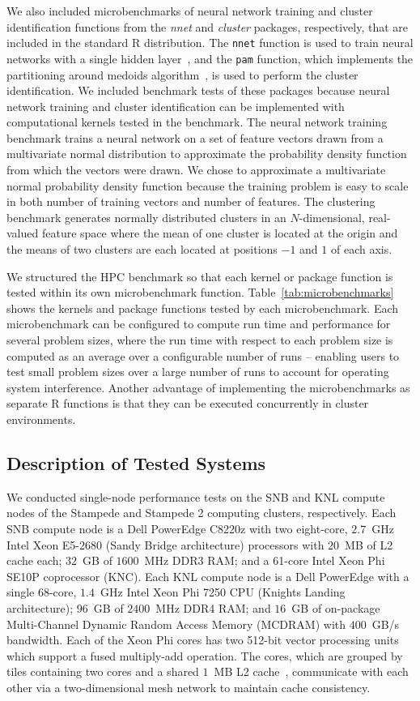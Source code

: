 We also included microbenchmarks of neural network training and cluster identification
functions from the \textit{nnet} and \textit{cluster} packages, respectively, that are
included in the standard R distribution. The \texttt{nnet} function is used to train
neural networks with a single hidden layer~\cite{ripley:pattern96}, and the \texttt{pam}
function, which implements the partitioning around medoids algorithm~\cite{chu:kmedoids,
reynolds:clustering}, is used to perform the cluster identification. We included benchmark
tests of these packages because neural network training and cluster identification can be
implemented with computational kernels tested in the benchmark. The neural network
training benchmark trains a neural network on a set of feature vectors drawn from a
multivariate normal distribution to approximate the probability density function from
which the vectors were drawn. We chose to approximate a multivariate normal probability
density function because the training problem is easy to scale in both number of training
vectors and number of features. The clustering benchmark generates normally distributed
clusters in an $N$-dimensional, real-valued feature space where the mean of one cluster is
located at the origin and the means of two clusters are each located at positions $-1$ and
$1$ of each axis.

We structured the HPC benchmark so that each kernel or package function is tested within
its own microbenchmark function. Table~\ref{tab:microbenchmarks} shows the kernels and
package functions tested by each microbenchmark. Each microbenchmark can be configured to
compute run time and performance for several problem sizes, where the run time with
respect to each problem size is computed as an average over a configurable number of runs
-- enabling users to test small problem sizes over a large number of runs to account for
operating system interference. Another advantage of implementing the microbenchmarks as
separate R functions is that they can be executed concurrently in cluster environments.

\subsection{Description of Tested Systems}

We conducted single-node performance tests on the SNB and KNL compute nodes of the
Stampede and Stampede 2 computing clusters, respectively. Each SNB compute node
is a Dell PowerEdge C8220z with two eight-core, $2.7$~GHz Intel Xeon E5-2680 (Sandy Bridge
architecture) processors with $20$~MB of L2 cache each; $32$~GB of $1600$~MHz DDR3 RAM;
and a 61-core Intel Xeon Phi SE10P coprocessor (KNC). Each KNL compute node is
a Dell PowerEdge with a single 68-core, $1.4$~GHz Intel Xeon Phi 7250 CPU (Knights Landing
architecture); $96$~GB of $2400$~MHz DDR4 RAM; and $16$~GB of on-package Multi-Channel
Dynamic Random Access Memory (MCDRAM) with $400$~GB/s bandwidth. Each of the Xeon Phi
cores has two 512-bit vector processing units which support a fused multiply-add
operation. The cores, which are grouped by tiles containing two cores and a shared $1$~MB
L2 cache~\cite{intel:xeonphi}, communicate with each other via a two-dimensional mesh
network to maintain cache consistency.

